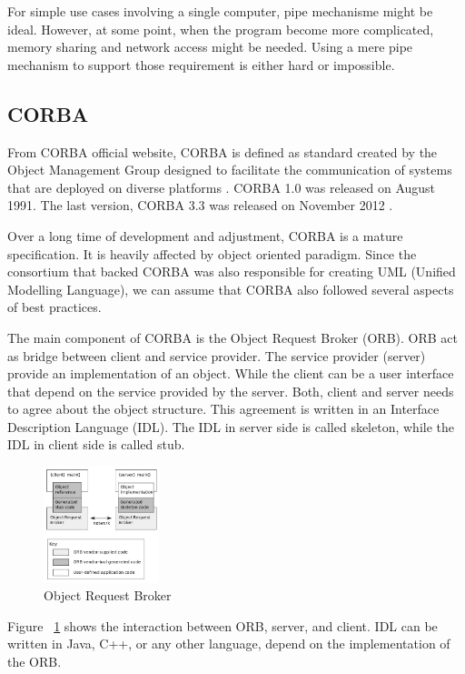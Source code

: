 \documentclass[conference]{IEEEtran}
\begin{document}
For simple use cases involving a single computer, pipe mechanisme might be ideal. 
However, at some point, when the program become more complicated, memory sharing 
and network access might be needed. Using a mere pipe mechanism to support those 
requirement is either hard or impossible.

\subsection{CORBA}

From CORBA official website, CORBA is defined as standard created by the Object 
Management Group designed to facilitate the communication of systems 
that are deployed on diverse platforms \cite{corba}. CORBA 1.0 was released on August 
1991. The last version, CORBA 3.3 was released on November 2012 \cite{corbaspec}.

Over a long time of development and adjustment, CORBA is a mature specification.
It is heavily affected by object oriented paradigm. Since the consortium that backed
CORBA was also responsible for creating UML (Unified Modelling Language), we can assume
that CORBA also followed several aspects of best practices.

The main component of CORBA is the Object Request Broker (ORB). ORB act as bridge 
between client and service provider. The service provider (server) provide an 
implementation of an object. While the client can be a user interface that depend on
the service provided by the server. Both, client and server needs to agree about the
object structure. This agreement is written in an Interface Description Language (IDL).
The IDL in server side is called skeleton, while the IDL in client side is called stub.

\begin{figure}
	\centering
	\includegraphics[width=0.3\textwidth]
		{images/Orb.jpg}
	\caption{Object Request Broker}
	\label{fig:orb}
\end{figure}

Figure ~\ref{fig:orb} shows the interaction between ORB, server, and client.
IDL can be written in Java, C++, or any other language, depend on the implementation of
the ORB.
\end{document}
